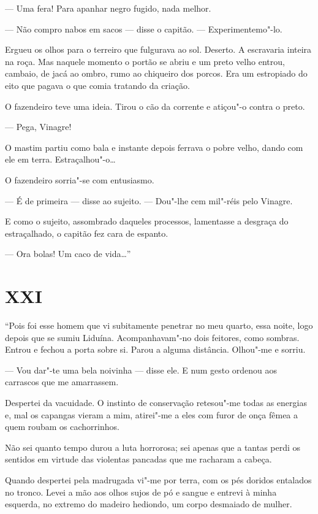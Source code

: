 --- Uma fera! Para apanhar negro fugido, nada melhor.

--- Não compro nabos em sacos --- disse o capitão. --- Experimentemo"-lo.

Ergueu os olhos para o terreiro que fulgurava ao sol. Deserto. A
escravaria inteira na roça. Mas naquele momento o portão se abriu e um
preto velho entrou, cambaio, de jacá ao ombro, rumo ao chiqueiro dos
porcos. Era um estropiado do eito que pagava o que comia tratando da
criação.

O fazendeiro teve uma ideia. Tirou o cão da corrente e atiçou"-o contra o
preto.

--- Pega, Vinagre!

O mastim partiu como bala e instante depois ferrava o pobre velho, dando
com ele em terra. Estraçalhou"-o\ldots{}

O fazendeiro sorria"-se com entusiasmo.

--- É de primeira --- disse ao sujeito. --- Dou"-lhe cem mil"-réis pelo
Vinagre.

E como o sujeito, assombrado daqueles processos, lamentasse a desgraça
do estraçalhado, o capitão fez cara de espanto.

--- Ora bolas! Um caco de vida\ldots{}''

\section*{XXI}

``Pois foi esse homem que vi subitamente penetrar no meu quarto, essa
noite, logo depois que se sumiu Liduína. Acompanhavam"-no dois feitores,
como sombras. Entrou e fechou a porta sobre si. Parou a alguma
distância. Olhou"-me e sorriu.

--- Vou dar"-te uma bela noivinha --- disse ele. E num gesto ordenou aos
carrascos que me amarrassem.

Despertei da vacuidade. O instinto de conservação retesou"-me todas as
energias e, mal os capangas vieram a mim, atirei"-me a eles com furor de
onça fêmea a quem roubam os cachorrinhos.

Não sei quanto tempo durou a luta horrorosa; sei apenas que a tantas
perdi os sentidos em virtude das violentas pancadas que me racharam a
cabeça.

Quando despertei pela madrugada vi"-me por terra, com os pés doridos
entalados no tronco. Levei a mão aos olhos sujos de pó e sangue e
entrevi à minha esquerda, no extremo do madeiro hediondo, um corpo
desmaiado de mulher.

